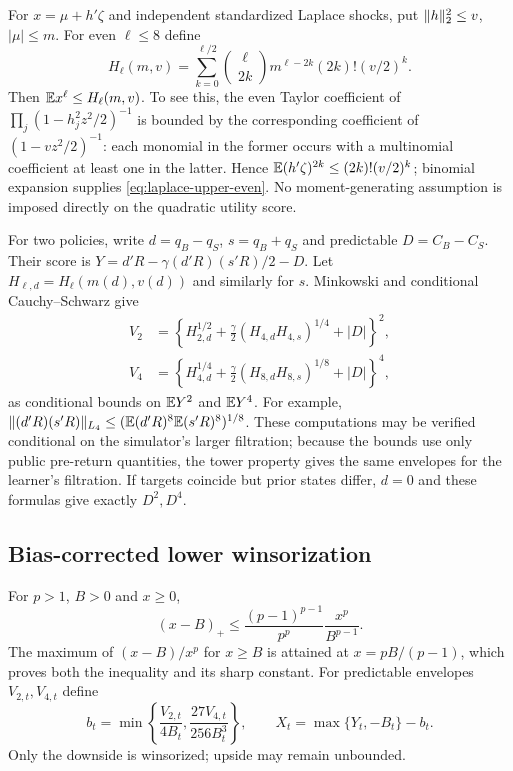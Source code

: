 For $x=\mu+h'\zeta$ and independent standardized Laplace shocks, put
$\lVert h\rVert_2^2\le v$, $|\mu|\le m$. For even $\ell\le8$ define
\begin{equation}
 H_\ell(m,v)=\sum_{k=0}^{\ell/2}
  \binom{\ell}{2k}m^{\ell-2k}(2k)!(v/2)^k.\label{eq:laplace-upper-even}
\end{equation}
Then $\mathbb E x^\ell\le H_\ell(m,v)$. To see this, the even Taylor coefficient of
$\prod_j(1-h_j^2z^2/2)^{-1}$ is bounded by the corresponding coefficient
of $(1-vz^2/2)^{-1}$: each monomial in the former occurs with a multinomial
coefficient at least one in the latter. Hence
$\mathbb E(h'\zeta)^{2k}\le(2k)!(v/2)^k$; binomial expansion supplies
\eqref{eq:laplace-upper-even}. No moment-generating assumption is imposed
directly on the quadratic utility score.

For two policies, write $d=q_B-q_S$, $s=q_B+q_S$ and predictable
$D=C_B-C_S$. Their score is $Y=d'R-\gamma(d'R)(s'R)/2-D$.
Let $H_{\ell,d}=H_\ell(m(d),v(d))$ and similarly for $s$.
Minkowski and conditional Cauchy--Schwarz give
\begin{align}
 V_2&=\left\{H_{2,d}^{1/2}
       +\frac\gamma2(H_{4,d}H_{4,s})^{1/4}+|D|\right\}^2,
       \label{eq:geometry-second}\\
 V_4&=\left\{H_{4,d}^{1/4}
       +\frac\gamma2(H_{8,d}H_{8,s})^{1/8}+|D|\right\}^4,
       \label{eq:geometry-fourth}
\end{align}
as conditional bounds on $\mathbb E Y^2$ and $\mathbb E Y^4$. For example,
$\lVert(d'R)(s'R)\rVert_{L_4}\le
(\mathbb E(d'R)^8\mathbb E(s'R)^8)^{1/8}$. These computations may be verified
conditional on the simulator's larger filtration; because the bounds use only
public pre-return quantities, the tower property gives the same envelopes
for the learner's filtration. If targets coincide but prior states differ,
$d=0$ and these formulas give exactly $D^2,D^4$.

\subsection{Bias-corrected lower winsorization}
For $p>1$, $B>0$ and $x\ge0$,
\begin{equation}
 (x-B)_+\le\frac{(p-1)^{p-1}}{p^p}\frac{x^p}{B^{p-1}}.\label{eq:sharp-tail}
\end{equation}
The maximum of $(x-B)/x^p$ for $x\ge B$ is attained at
$x=pB/(p-1)$, which proves both the inequality and its sharp constant.
For predictable envelopes $V_{2,t},V_{4,t}$ define
\begin{equation}
 b_t=\min\left\{\frac{V_{2,t}}{4B_t},
                       \frac{27V_{4,t}}{256B_t^3}\right\},\qquad
 X_t=\max\{Y_t,-B_t\}-b_t.\label{eq:corrected-score}
\end{equation}
Only the downside is winsorized; upside may remain unbounded.

